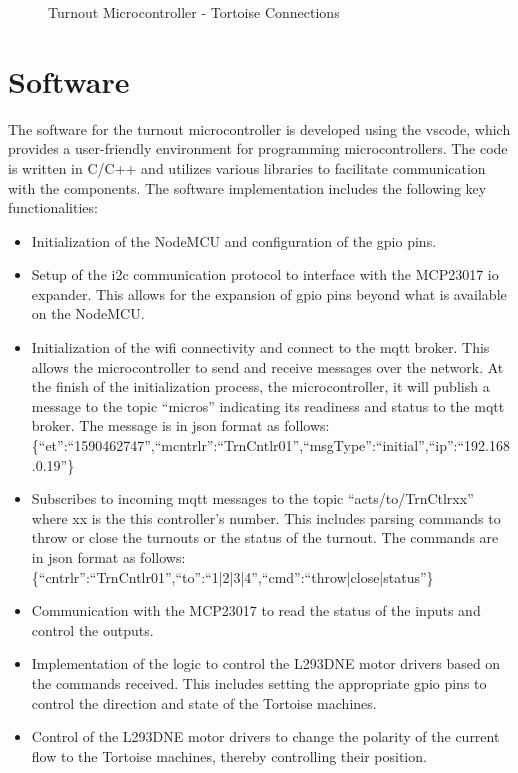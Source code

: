 \begin{figure}[H]
  \caption{Turnout Microcontroller - Tortoise Connections}
  \label{fig:turnout-connections}
\end{figure}

\section{Software}
The software for the turnout microcontroller is developed using the \gls{vscode}, which provides a user-friendly environment for programming microcontrollers. The code is written in C/C++ and utilizes various 
libraries to facilitate communication with the components.
The software implementation includes the following key functionalities:
\begin{itemize}
\item Initialization of the NodeMCU and configuration of the \gls{gpio} pins.
\item Setup of the \gls{i2c} communication protocol to interface with the MCP23017 \gls{io} expander. This allows for the expansion of \gls{gpio} pins beyond what is available on the NodeMCU.
\item Initialization of the \gls{wifi} connectivity and connect to the \gls{mqtt} broker. This allows the microcontroller to send and receive messages over the network.
At the finish of the initialization process, the microcontroller, it will publish a message to the topic ``micros'' indicating its readiness and status to the \gls{mqtt} broker. The message is in \gls{json} format as follows:\\
\{``et'':``1590462747'',``mcntrlr'':``TrnCntlr01'',``msgType'':``initial'',``ip'':``192.168.0.19''\}
\item Subscribes to incoming \gls{mqtt} messages to the topic ``acts/to/TrnCtlrxx'' where xx is the this controller's number. This includes parsing commands to throw or close the turnouts or the status of the turnout. 
The commands are in \gls{json} format as follows:\\
\{``cntrlr'':``TrnCntlr01'',``to'':``1|2|3|4'',``cmd'':``throw|close|status''\}
\item Communication with the MCP23017 to read the status of the inputs and control the outputs.
\item Implementation of the logic to control the L293DNE motor drivers based on the commands received. This includes setting the appropriate \gls{gpio} pins to control the direction and state of the Tortoise machines.
\item Control of the L293DNE motor drivers to change the polarity of the current flow to the Tortoise machines, thereby controlling their position.

\end{itemize}
